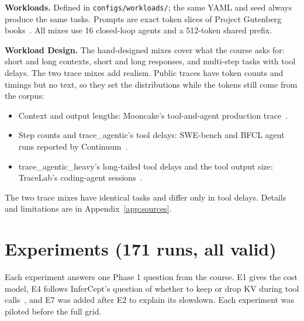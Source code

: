 \documentclass[10pt]{article}
\begin{document}
\textbf{Workloads.} Defined in \texttt{configs/workloads/}; the same YAML and seed always produce the same tasks.
Prompts are exact token slices of Project Gutenberg books~\cite{gutenberg}. All mixes use 16 closed-loop agents and a
512-token shared prefix.


\textbf{Workload Design.} The hand-designed mixes cover what the course asks for: short and long
contexts, short and long responses, and multi-step tasks with tool delays. The two trace mixes add realism. Public traces
have token counts and timings but no text, so they set the distributions while the tokens still come from the corpus:
\begin{itemize}
\item Context and output lengths: Mooncake's tool-and-agent production trace~\cite{mooncake}.
\item Step counts and trace\_agentic's tool delays: SWE-bench and BFCL agent runs reported by Continuum~\cite{continuum}.
\item trace\_agentic\_heavy's long-tailed tool delays and the tool output size: TraceLab's coding-agent
sessions~\cite{tracelab}.
\end{itemize}
The two trace mixes have identical tasks and differ only in tool delays. Details and limitations are in
Appendix~\ref{app:sources}.

\section{Experiments (171 runs, all valid)}
Each experiment answers one Phase 1 question from the course. E1 gives the cost model, E4 follows InferCept's question
of whether to keep or drop KV during tool calls~\cite{infercept}, and E7 was added after E2 to explain its slowdown. Each
experiment was piloted before the full grid.
\end{document}
